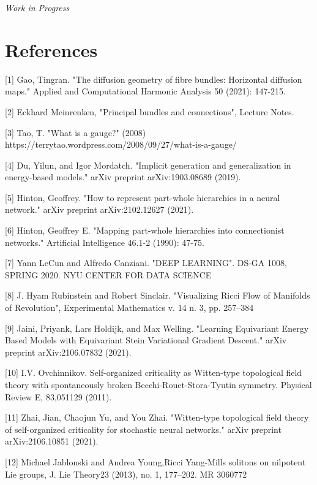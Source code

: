 \documentclass{article}
\begin{document}
\textit{Work in Progress}


\section*{References}

\small

[1] Gao, Tingran. "The diffusion geometry of fibre bundles: Horizontal diffusion maps." Applied and Computational Harmonic Analysis 50 (2021): 147-215.

[2] Eckhard Meinrenken, "Principal bundles and connections", Lecture Notes. 

[3] Tao, T. "What is a gauge?" (2008) https://terrytao.wordpress.com/2008/09/27/what-is-a-gauge/

[4] Du, Yilun, and Igor Mordatch. "Implicit generation and generalization in energy-based models." arXiv preprint arXiv:1903.08689 (2019).


[5] Hinton, Geoffrey. "How to represent part-whole hierarchies in a neural network." arXiv preprint arXiv:2102.12627 (2021).

[6] Hinton, Geoffrey E. "Mapping part-whole hierarchies into connectionist networks." Artificial Intelligence 46.1-2 (1990): 47-75.

[7]  Yann LeCun  and Alfredo Canziani. "DEEP LEARNING". DS-GA 1008, SPRING 2020. NYU CENTER FOR DATA SCIENCE

[8] J. Hyam Rubinstein and Robert Sinclair. "Visualizing Ricci Flow of Manifolds of Revolution", Experimental Mathematics v. 14 n. 3, pp. 257–384

[9] Jaini, Priyank, Lars Holdijk, and Max Welling. "Learning Equivariant Energy Based Models with Equivariant Stein Variational Gradient Descent." arXiv preprint arXiv:2106.07832 (2021).

[10] I.V. Ovchinnikov. Self-organized criticality as Witten-type topological field theory with spontaneously
broken Becchi-Rouet-Stora-Tyutin symmetry. Physical Review E, 83,051129 (2011).

[11] Zhai, Jian, Chaojun Yu, and You Zhai. "Witten-type topological field theory of self-organized criticality for stochastic neural networks." arXiv preprint arXiv:2106.10851 (2021).

[12] Michael Jablonski and Andrea Young,Ricci Yang-Mills solitons on nilpotent Lie groups, J. Lie Theory23 (2013), no. 1, 177–202. MR 3060772
\end{document}
